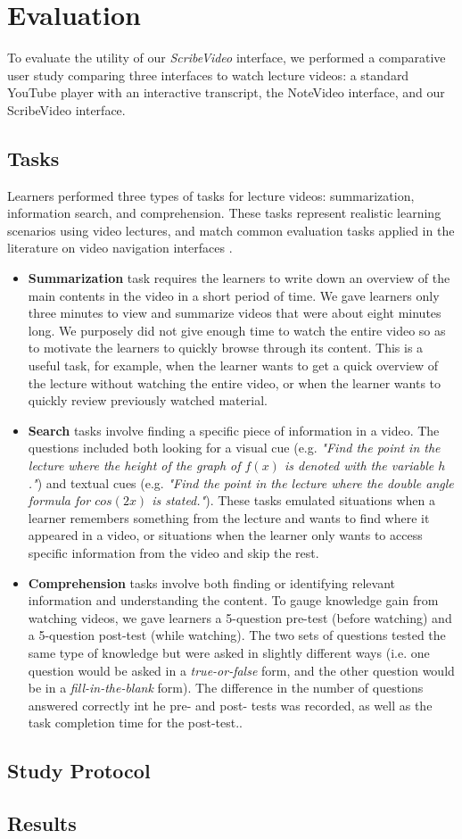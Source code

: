 \section{Evaluation}
To evaluate the utility of our \textit{ScribeVideo} interface, we performed a comparative user study comparing three interfaces to watch lecture videos: a standard YouTube player with an interactive transcript, the NoteVideo interface, and our ScribeVideo interface.  

\subsection{Tasks}
Learners performed three types of tasks for lecture videos: summarization, information search, and comprehension. These tasks represent realistic learning scenarios using video lectures, and match common evaluation tasks applied in the literature on video navigation interfaces \cite{}.
\begin{itemize}
\item \textbf{Summarization} task requires the learners to write down an overview of the main contents in the video in a short period of time. We gave learners only three minutes to view and summarize videos that were about eight minutes long. We purposely did not give enough time to watch the entire video so as to motivate the learners to quickly browse through its content. This is a useful task, for example, when the learner wants to get a quick overview of the lecture without watching the entire video, or when the learner wants to quickly review previously watched material. 
\item \textbf{Search} tasks involve finding a specific piece of information in a video. The questions included both looking for a visual cue (e.g. \textit{"Find the point in the lecture where the height of the graph of $f(x)$ is denoted with the variable $h$."}) and textual cues (e.g. \textit{"Find the point in the lecture where the double angle formula for $cos(2x)$ is stated."}). These tasks emulated situations when a learner remembers something from the lecture and wants to find where it appeared in a video, or situations when the learner only wants to access specific information from the video and skip the rest.  
\item \textbf{Comprehension} tasks involve both finding or identifying relevant information and understanding the content. To gauge knowledge gain from watching videos, we gave learners a 5-question pre-test (before watching) and a 5-question post-test (while watching). The two sets of questions tested the same type of knowledge but were asked in slightly different ways (i.e. one question
would be asked in a \textit{true-or-false} form, and the other question would be in a \textit{fill-in-the-blank} form). The difference in the number of questions answered correctly int he pre- and post- tests was recorded, as well as the task completion time for the post-test.. 
\end{itemize}

\subsection{Study Protocol}
\subsection{Results}
